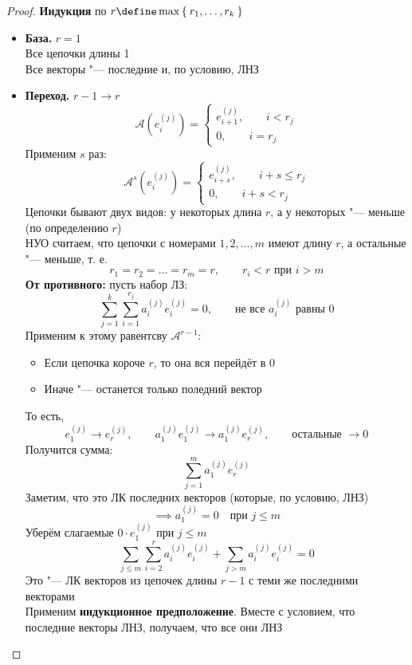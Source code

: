 \begin{proof}
	\textbf{Индукция} по $ r \define \max\set{r_1, \dots, r_k} $
	\begin{itemize}
		\item \textbf{База.} $ r = 1 $ \\
		Все цепочки длины 1 \\
		Все векторы "--- последние и, по условию, ЛНЗ
		\item \textbf{Переход.} $ r - 1 \to r $
		$$ \mathcal{A}(e_i^{(j)}) =
		\begin{cases}
			e_{i + 1}^{(j)}, \qquad i < r_j \\
			0, \qquad i = r_j
		\end{cases} $$
		Применим $ s $ раз:
		$$ \mathcal{A}^s(e_i^{(j)}) =
		\begin{cases}
			e_{i + s}^{(j)}, \qquad i + s \le r_j \\
			0, \qquad i + s < r_j
		\end{cases} $$
		Цепочки бывают двух видов: у некоторых длина $ r $, а у некоторых "--- меньше (по определению $ r $) \\
		НУО считаем, что цепочки с номерами $ 1, 2, \dots, m $ имеют длину $ r $, а остальные "--- меньше, т. е.
		$$ r_1 = r_2 = \dots = r_m = r, \qquad r_i < r \text{ при } i > m $$
		\textbf{От противного:} пусть набор ЛЗ:
		$$ \sum_{j = 1}^k \sum_{i = 1}^{r_j} a_i^{(j)}e_i^{(j)} = 0, \qquad \text{не все } a_i^{(j)} \text{ равны } 0 $$
		Применим к этому равентсву $ \mathcal{A}^{r- 1} $:
		\begin{itemize}
			\item Если цепочка короче $ r $, то она вся перейдёт в 0
			\item Иначе "--- останется только поледний вектор
		\end{itemize}
		То есть,
		$$ e_1^{(j)} \to e_r^{(j)}, \qquad a_1^{(j)}e_1^{(j)} \to a_1^{(j)}e_r^{(j)}, \qquad \text{остальные } \to 0 $$
		Получится сумма:
		$$ \sum_{j = 1}^m a_1^{(j)} e_r^{(j)} $$
		Заметим, что это ЛК последних векторов (которые, по условию, ЛНЗ)
		$$ \implies a_1^{(j)} = 0 \quad \text{при } j \le m $$
		Уберём слагаемые $ 0 \cdot e_1^{(j)} $ при $ j \le m $
		$$ \sum_{j \le m} \sum_{i = 2}^r a_i^{(j)} e_i^{(j)} + \sum_{j > m}a_i^{(j)}e_i^{(j)} = 0 $$
		Это "--- ЛК векторов из цепочек длины $ r - 1 $ с теми же последними векторами \\
		Применим \textbf{индукционное предположение}. Вместе с условием, что последние векторы ЛНЗ, получаем, что все они ЛНЗ
	\end{itemize}
\end{proof}


